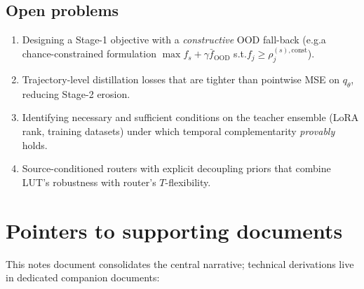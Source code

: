 \documentclass[11pt,a4paper]{article}
\newcommand{\OOD}{\mathrm{OOD}}
\newcommand{\const}{\mathrm{const}}
\theoremstyle{definition}
\begin{document}
\subsection{Open problems}
\begin{enumerate}[leftmargin=1.5em]
\item Designing a Stage-1 objective with a \emph{constructive} OOD
fall-back (e.g.\@ a chance-constrained formulation
$\max f_s + \gamma \bar f_{\OOD}$ s.t.\@ $f_j\geq \rho_j^{(s),\const}$).
\item Trajectory-level distillation losses that are tighter than
pointwise MSE on $q_\theta$, reducing Stage-2 erosion.
\item Identifying necessary and sufficient conditions on the teacher
ensemble (LoRA rank, training datasets) under which temporal
complementarity \emph{provably} holds.
\item Source-conditioned routers with explicit decoupling priors that
combine LUT's robustness with router's $T$-flexibility.
\end{enumerate}

\appendix
\section{Pointers to supporting documents}
\label{app:supports}

This notes document consolidates the central narrative; technical
derivations live in dedicated companion documents:
\end{document}
